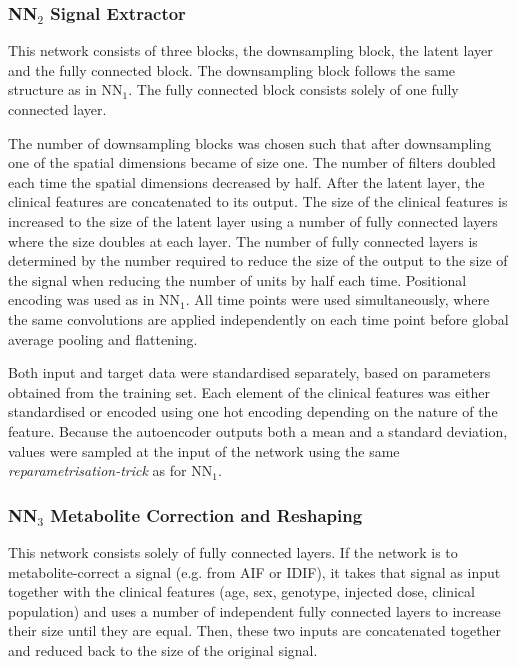         \subsubsection{\gls{NN}$_2$ Signal Extractor} \label{sec:NN2}
            This network consists of three blocks, the downsampling block, the latent layer and the fully connected block. The downsampling block follows the same structure as in \gls{NN}$_1$. The fully connected block consists solely of one fully connected layer.

            The number of downsampling blocks was chosen such that after downsampling one of the spatial dimensions became of size one. The number of filters doubled each time the spatial dimensions decreased by half. After the latent layer, the clinical features are concatenated to its output. The size of the clinical features is increased to the size of the latent layer using a number of fully connected layers where the size doubles at each layer. The number of fully connected layers is determined by the number required to reduce the size of the output to the size of the signal when reducing the number of units by half each time. Positional encoding was used as in \gls{NN}$_1$. All time points were used simultaneously, where the same convolutions are applied independently on each time point before global average pooling and flattening.

            Both input and target data were standardised separately, based on parameters obtained from the training set. Each element of the clinical features was either standardised or encoded using one hot encoding depending on the nature of the feature. Because the autoencoder outputs both a mean and a standard deviation, values were sampled at the input of the network using the same \textit{reparametrisation-trick} as for \gls{NN}$_1$.

        \subsubsection{\gls{NN}$_3$ Metabolite Correction and Reshaping} \label{sec:NN3}
            This network consists solely of fully connected layers. If the network is to metabolite-correct a signal (e.g. from \gls{AIF} or \gls{IDIF}), it takes that signal as input together with the clinical features (age, sex, genotype, injected dose, clinical population) and uses a number of independent fully connected layers to increase their size until they are equal. Then, these two inputs are concatenated together and reduced back to the size of the original signal.

